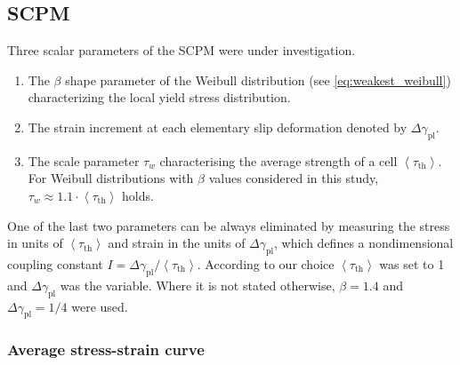 \subsection{SCPM} \label{sec:weakest_SCPM}
Three scalar parameters of the SCPM were under investigation.
\begin{enumerate}
\item The $\beta$ shape parameter of the Weibull distribution (see \cref{eq:weakest_weibull}) characterizing the local yield stress distribution.
\item The strain increment at each elementary slip deformation denoted by $\Delta {\gamma _{{\text{pl}}}}$.
\item The scale parameter $\tau_w$ characterising the average strength of a cell $\left\langle {{\tau _{{\text{th}}}}} \right\rangle $. For Weibull distributions with $\beta$ values considered in this study, ${\tau _w} \approx 1.1 \cdot \left\langle {{\tau _{{\text{th}}}}} \right\rangle $ holds.
\end{enumerate}
One of the last two parameters can be always eliminated by measuring the stress in units of $\left\langle {{\tau _{{\text{th}}}}} \right\rangle $ and strain in the units of $\Delta {\gamma _{{\text{pl}}}}$, which defines a nondimensional coupling constant $I = \Delta {\gamma _{{\text{pl}}}}/\left\langle {{\tau _{{\text{th}}}}} \right\rangle $. According to our choice $\left\langle {{\tau _{{\text{th}}}}} \right\rangle $ was set to 1 and $\Delta {\gamma _{{\text{pl}}}}$ was the variable. Where it is not stated otherwise, $\beta=1.4$ and $\Delta {\gamma _{{\text{pl}}}} = 1/4$ were used.

\subsubsection{Average stress-strain curve} \label{sec:weakest_scpm_av_ssc}


